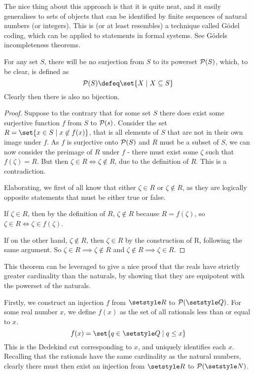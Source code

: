 The nice thing about this approach is that it is quite neat, and it easily
generalises to sets of objects that can be identified by finite sequences of
natural numbers (or integers). This is (or at least resembles) a technique
called G\"odel coding, which can be applied to statements in formal systems. See
G\"odels incompleteness theorems.

\begin{theorem}
 For any set \(S\), there will be no surjection from \(S\) to its powerset
 \(\operatorname{\mathcal P}(S)\), which, to be clear, is defined as
 \begin{equation*}
  \PowerSet(S) \defeq \set{X \mid X \subseteq S}
 \end{equation*}
 Clearly then there is also no bijection.
\end{theorem}
\begin{proof}
 Suppose to the contrary that for some set \(S\) there does exist some
 surjective function \(f\) from \(S\) to \(\operatorname{\mathcal P}(s)\). Consider the set
 \(R = \set{x \in S \mid x \not\in f(x)}\), that is all elements of \(S\) that
 are not in their own image under \(f\). As \(f\) is surjective onto
 \(\operatorname{\mathcal P}(S)\) and \(R\) must be a subset of \(S\), we can now consider the
 preimage of \(R\) under \(f\) - there must exist some \(\zeta\) such that
 \(f(\zeta) = R\). But then \(\zeta \in R \iff \zeta \not\in R\), due to the
 definition of \(R\). This is a contradiction.

 Elaborating, we first of all know that either \(\zeta \in R\) or
 \(\zeta \not\in R\), as they are logically opposite statements that must be
 either true or false.

 If \(\zeta \in R\), then by the definition of \(R\),
 \(\zeta \not\in R\) because \(R = f(\zeta)\), so
 \(\zeta \in R \iff \zeta \in f(\zeta)\).

 If on the other hand, \(\zeta \not\in R\), then \(\zeta \in R\) by the
 construction of R, following the same argument. So
 \(\zeta \in R \implies \zeta \not\in R\) and
 \(\zeta \not\in R \implies \zeta \in R\).
\end{proof}

This theorem can be leveraged to give a nice proof that the reals have strictly
greater cardinality than the naturals, by showing that they are equipotent with
the powerset of the naturals.

Firstly, we construct an injection \(f\) from \(\Reals\) to
\(\PowerSet(\Rationals)\). For some real number \(x\), we define \(f(x)\) as the
set of all rationals less than or equal to \(x\).
\begin{equation*}
 f(x) = \set{q \in \Rationals \mid q \le x}
\end{equation*}
This is the Dedekind cut corresponding to \(x\), and uniquely identifies each
\(x\). Recalling that the rationals have the same cardinality as the natural
numbers, clearly there must then exist an injection from \(\Reals\) to
\(\PowerSet(\Naturals)\).

